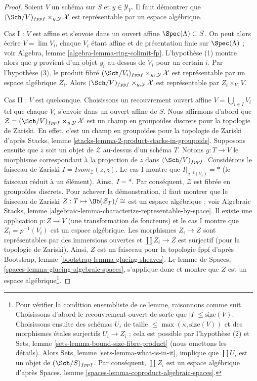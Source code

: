 \begin{proof}
Soient $V$ un schéma sur $S$ et $y \in \mathcal{Y}_V$. Il faut démontrer que
$(\Sch/V)_{fppf} \times_{y, \mathcal{Y}} \mathcal{X}$ est représentable
par un espace algébrique.

\medskip\noindent
Cas I : $V$ est affine et s'envoie dans un ouvert affine $\Spec(\Lambda) \subset S$.
On peut alors écrire $V = \lim V_i$, chaque $V_i$ étant affine et de
présentation finie sur $\Spec(\Lambda)$ ; voir
Algebra, lemme \ref{algebra-lemma-ring-colimit-fp}.
L'hypothèse (1) montre alors que $y$ provient d'un objet $y_i$ au-dessus de $V_i$ pour un certain $i$.
Par l'hypothèse (3), le produit fibré
$(\Sch/V_i)_{fppf} \times_{y_i, \mathcal{Y}} \mathcal{X}$ est représentable
par un espace algébrique $Z_i$. Alors
$(\Sch/V)_{fppf} \times_{y, \mathcal{Y}} \mathcal{X}$ est représentable
par $Z_i \times_{V_i} V$.

\medskip\noindent
Cas II : $V$ est quelconque. Choisissons un recouvrement ouvert affine
$V = \bigcup_{i \in I} V_i$ tel que chaque $V_i$ s'envoie dans un ouvert affine
de $S$. Nous affirmons d'abord
que $\mathcal{Z} = (\Sch/V)_{fppf} \times_{y, \mathcal{Y}} \mathcal{X}$
est un champ en groupoïdes discrets pour la topologie de Zariski. En effet, c'est un champ en
groupoïdes pour la topologie de Zariski d'après
Stacks, lemme \ref{stacks-lemma-2-product-stacks-in-groupoids}.
Supposons ensuite que $z$ soit un objet de $\mathcal{Z}$ au-dessus d'un schéma $T$.
Notons $g : T \to V$ le morphisme correspondant à la
projection de $z$ dans $(\Sch/V)_{fppf}$. Considérons le faisceau de Zariski
$\mathit{I} = \mathit{Isom}_{\mathcal{Z}}(z, z)$. Le cas I montre que
$\mathit{I}|_{g^{-1}(V_i)} = *$ (le faisceau réduit à un élément). Ainsi,
$\mathit{I} = *$. Par conséquent, $\mathcal{Z}$ est fibrée en groupoïdes discrets. Pour achever
la démonstration, il faut montrer que le faisceau de Zariski
$Z : T \mapsto \Ob(\mathcal{Z}_T)/\cong$ est un espace algébrique ; voir
Algebraic Stacks, lemme
\ref{algebraic-lemma-characterize-representable-by-space}.
Il existe une application $p : Z \to V$ (une transformation de foncteurs) et le cas I
montre que $Z_i = p^{-1}(V_i)$ est un espace algébrique. Les morphismes
$Z_i \to Z$ sont représentables par des immersions ouvertes et
$\coprod Z_i \to Z$ est surjectif (pour la topologie de Zariski).
Ainsi, $Z$ est un faisceau pour la topologie fppf d'après
Bootstrap, lemme \ref{bootstrap-lemma-glueing-sheaves}.
Le lemme de Spaces, \ref{spaces-lemma-glueing-algebraic-spaces},
s'applique donc et montre que $Z$ est un espace algébrique\footnote{
Pour vérifier la condition ensembliste de ce lemme,
raisonnons comme suit. Choisissons d'abord le recouvrement ouvert de sorte que
$|I| \leq \text{size}(V)$. Choisissons ensuite des schémas $U_i$ de taille
$\leq \max(\kappa, \text{size}(V))$ et des morphismes étales surjectifs
$U_i \to Z_i$ ; cela est possible par l'hypothèse (2) et
Sets, lemme \ref{sets-lemma-bound-size-fibre-product}
(nous omettons les détails). Alors
Sets, lemme \ref{sets-lemma-what-is-in-it},
implique que $\coprod U_i$ est un objet de $(\Sch/S)_{fppf}$.
Par conséquent, $\coprod Z_i$ est un espace algébrique d'après
Spaces, lemme \ref{spaces-lemma-coproduct-algebraic-spaces}.
}.
\end{proof}


